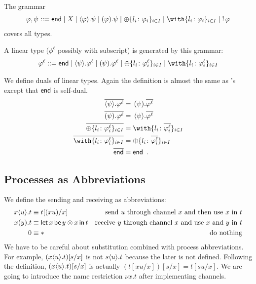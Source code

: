     The grammar
    \[
     \phi,\psi ::= \terminate\mid X \mid \sendtype\phi\psi \mid
     \recvtype\phi\psi
     \mid \oplus\{l_i\colon\phi_i\}_{i\in I}
     \mid \with\{l_i\colon\phi_i\}_{i\in I}
     \mid \bang\phi
    \]
    covers all types.

    A linear type ($\phi^\ell$ possibly with subscript) is generated by
    this grammar:
    \[
     \phi^\ell ::= \terminate\mid
     \sendtype{\psi}{\phi^\ell} \mid
     \recvtype{\psi}{\phi^\ell}
     \mid \oplus\{l_i\colon\phi^\ell_i\}_{i\in I}
     \mid \with\{l_i\colon\phi^\ell_i\}_{i\in I}
    \]

    We define duals of linear types.
    Again the definition is almost the
    same as \citet{wadler2012propositions}'s except that $\mathsf{end}$ is
    self-dual.
    \begin{align*}
     \overline{\sendtype\psi{\phi^\ell}}&= \,\recvtype\psi{\overline{\phi^\ell}}\\
     \overline{\recvtype\psi{\phi^\ell}}&= \,\sendtype\psi{\overline{\phi^\ell}}\\
     \overline{\oplus\{l_i\colon \phi^\ell_i\}_{i\in I}} &=
     \with\{l_i\colon \overline{\phi^\ell_i}\}_{i\in I} \\
     \overline{\with\{l_i\colon \phi^\ell_i\}_{i\in I}} &=
     \oplus\{l_i\colon \overline{\phi^\ell_i}\}_{i\in I} \\
     \overline{\terminate} &= \terminate\enspace.
    \end{align*}

    \subsection{Processes as Abbreviations}

    We define the sending and receiving as abbreviations:
    \begin{align*}
     {x}\langle{u}\rangle.{t} &\equiv t[(xu) /x] &\text{send $u$ through channel
     $x$ and then use $x$ in $t$} \\
     {{x}({y}).{t}} &\equiv \mathsf{let }\,{x}\,\mathsf{ be }\,{y\otimes x}\,\mathsf{ in }\,{t} & \text{receive
     $y$ through channel $x$ and use $x$ and $y$ in $t$} \\
     0 &\equiv \ast &\text{do nothing}
    \end{align*}
    We have to be careful about substitution combined with process
    abbreviations.
    For example, $({x}\langle{u}\rangle.{t})[s/x]$ is not ${s}\langle{u}\rangle.{t}$
    because the later is not defined.  Following the definition,
    $({x}\langle{u}\rangle.{t})[s/x]$ is actually $(t[xu/x])[s/x] = t[su/x]$.
    We are going to introduce the name restriction $\nu x.t$ after
    implementing channels.

